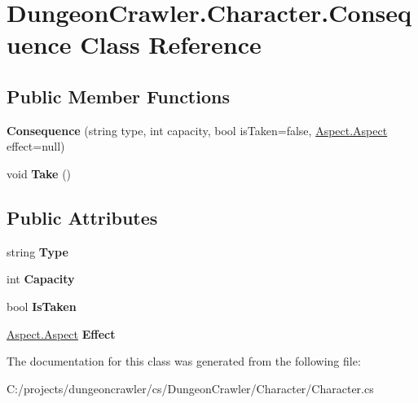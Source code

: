 \hypertarget{class_dungeon_crawler_1_1_character_1_1_consequence}{}\section{Dungeon\+Crawler.\+Character.\+Consequence Class Reference}
\label{class_dungeon_crawler_1_1_character_1_1_consequence}
\subsection*{Public Member Functions}
\begin{DoxyCompactItemize}
\item 
\hypertarget{class_dungeon_crawler_1_1_character_1_1_consequence_a36ab18540b01d760665d2fe25a191d6c}{}{\bfseries Consequence} (string type, int capacity, bool is\+Taken=false, \hyperlink{class_dungeon_crawler_1_1_aspect_1_1_aspect}{Aspect.\+Aspect} effect=null)\label{class_dungeon_crawler_1_1_character_1_1_consequence_a36ab18540b01d760665d2fe25a191d6c}

\item 
\hypertarget{class_dungeon_crawler_1_1_character_1_1_consequence_ad9944b48d59878f68d5339ba5add1db5}{}void {\bfseries Take} ()\label{class_dungeon_crawler_1_1_character_1_1_consequence_ad9944b48d59878f68d5339ba5add1db5}

\end{DoxyCompactItemize}
\subsection*{Public Attributes}
\begin{DoxyCompactItemize}
\item 
\hypertarget{class_dungeon_crawler_1_1_character_1_1_consequence_afc2e03283729c13bb9971390d382d517}{}string {\bfseries Type}\label{class_dungeon_crawler_1_1_character_1_1_consequence_afc2e03283729c13bb9971390d382d517}

\item 
\hypertarget{class_dungeon_crawler_1_1_character_1_1_consequence_ab6931c76cc48bf013f71a7128df9decf}{}int {\bfseries Capacity}\label{class_dungeon_crawler_1_1_character_1_1_consequence_ab6931c76cc48bf013f71a7128df9decf}

\item 
\hypertarget{class_dungeon_crawler_1_1_character_1_1_consequence_ab01e2cf751dff41dc90dd550991e8dda}{}bool {\bfseries Is\+Taken}\label{class_dungeon_crawler_1_1_character_1_1_consequence_ab01e2cf751dff41dc90dd550991e8dda}

\item 
\hypertarget{class_dungeon_crawler_1_1_character_1_1_consequence_af27f8de91d8b49f1a48ad292f2208d97}{}\hyperlink{class_dungeon_crawler_1_1_aspect_1_1_aspect}{Aspect.\+Aspect} {\bfseries Effect}\label{class_dungeon_crawler_1_1_character_1_1_consequence_af27f8de91d8b49f1a48ad292f2208d97}

\end{DoxyCompactItemize}


The documentation for this class was generated from the following file\+:\begin{DoxyCompactItemize}
\item 
C\+:/projects/dungeoncrawler/cs/\+Dungeon\+Crawler/\+Character/Character.\+cs\end{DoxyCompactItemize}
